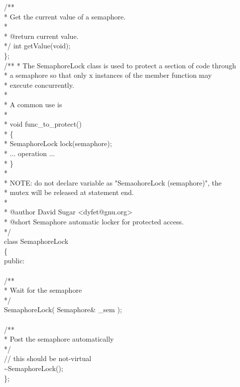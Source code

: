 \documentclass[fleqn,10pt,a4paper,titlepage]{article}
\begin{document}
{    /**\\
     * Get the current value of a semaphore.\\
     *\\
     * @return current value.\\
     */
     int getValue(void);\\
    \};
     \\
     /**
     * The SemaphoreLock class is used to protect a section of code through\\
     * a semaphore so that only x instances of the member function may\\
     * execute concurrently.\\
     *\\
     * A common use is\\
     *\\
     * void func\_to\_protect()\\
     * \{\\
     *   SemaphoreLock lock(semaphore);\\
     *   ... operation ...\\
     * \}\\
     *\\
     * NOTE: do not declare variable as "SemaohoreLock (semaphore)", the\\
     * mutex will be released at statement end.\\
     *\\
     * @author David Sugar \textless dyfet@gnu.org\textgreater\\
     * @short Semaphore automatic locker for protected access.\\
     */\\
     class SemaphoreLock\\
     \{\\
     public:\\\\
     /**\\
     * Wait for the semaphore\\
     */\\
     SemaphoreLock( Semaphore\& \_sem );\\\\
     /**\\
     * Post the semaphore automatically\\
     */\\
     // this should be not-virtual\\
     \~{}SemaphoreLock();\\
     \};
    }      
\end{document}
